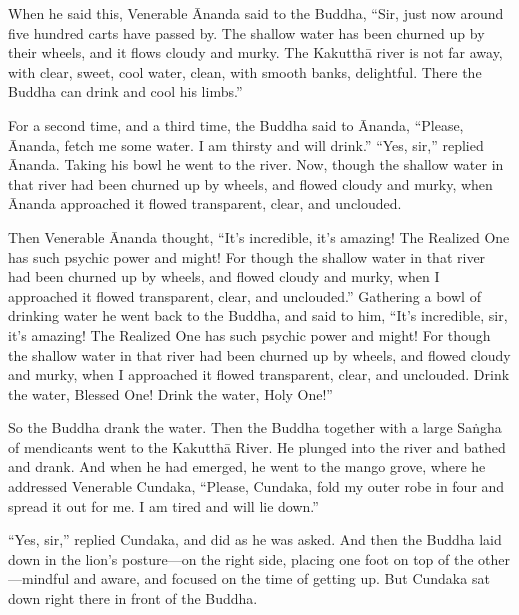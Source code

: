 \documentclass[12pt,openany]{book}%
\begin{document}
When he said this, Venerable Ānanda said to the Buddha, “Sir, just now around five hundred carts have passed by. The shallow water has been churned up by their wheels, and it flows cloudy and murky. The \textsanskrit{Kakutthā} river is not far away, with clear, sweet, cool water, clean, with smooth banks, delightful. There the Buddha can drink and cool his limbs.” 

For a second time, and a third time, the Buddha said to Ānanda, “Please, Ānanda, fetch me some water. I am thirsty and will drink.” “Yes, sir,” replied Ānanda. Taking his bowl he went to the river. Now, though the shallow water in that river had been churned up by wheels, and flowed cloudy and murky, when Ānanda approached it flowed transparent, clear, and unclouded. 

Then Venerable Ānanda thought, “It’s incredible, it’s amazing! The Realized One has such psychic power and might! For though the shallow water in that river had been churned up by wheels, and flowed cloudy and murky, when I approached it flowed transparent, clear, and unclouded.” Gathering a bowl of drinking water he went back to the Buddha, and said to him, “It’s incredible, sir, it’s amazing! The Realized One has such psychic power and might! For though the shallow water in that river had been churned up by wheels, and flowed cloudy and murky, when I approached it flowed transparent, clear, and unclouded. Drink the water, Blessed One! Drink the water, Holy One!” 

So the Buddha drank the water. Then the Buddha together with a large \textsanskrit{Saṅgha} of mendicants went to the \textsanskrit{Kakutthā} River. He plunged into the river and bathed and drank. And when he had emerged, he went to the mango grove, where he addressed Venerable Cundaka, “Please, Cundaka, fold my outer robe in four and spread it out for me. I am tired and will lie down.” 

“Yes, sir,” replied Cundaka, and did as he was asked. And then the Buddha laid down in the lion’s posture—on the right side, placing one foot on top of the other—mindful and aware, and focused on the time of getting up. But Cundaka sat down right there in front of the Buddha. 
\end{document}
